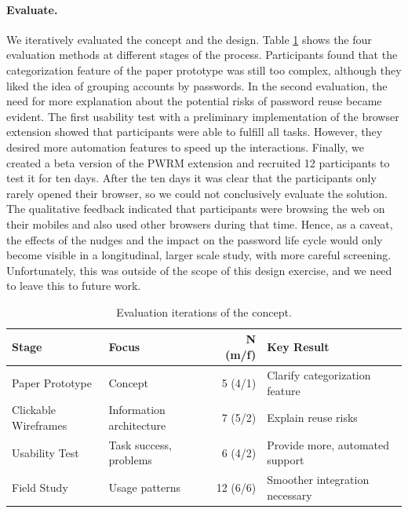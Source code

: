 \paragraph{Evaluate.} 
We iteratively evaluated the concept and the design. Table \ref{tab:pwrm:evaluations} shows the four evaluation methods at different stages of the process. Participants found that the categorization feature of the paper prototype was still too complex, although they liked the idea of grouping accounts by passwords. In the second evaluation, the need for more explanation about the potential risks of password reuse became evident. The first usability test with a preliminary implementation of the browser extension showed that participants were able to fulfill all tasks. However, they desired more automation features to speed up the interactions. Finally, we created a beta version of the PWRM extension and recruited 12 participants to test it for ten days. After the ten days it was clear that the participants only rarely opened their browser, so we could not conclusively evaluate the solution. The qualitative feedback indicated that participants were browsing the web on their mobiles and also used other browsers during that time. Hence, as a caveat, the effects of the nudges and the impact on the password life cycle would only become visible in a longitudinal, larger scale study, with more careful screening. Unfortunately, this was outside of the scope of this design exercise, and we need to leave this to future work. 

\begin{table}
	\begin{tabular}{llrp{9cm}}
		\textbf{Stage} & \textbf{Focus} & \textbf{N} (m/f) & \textbf{Key Result}\\ \hline
		Paper Prototype & Concept & 5 (4/1) & Clarify categorization feature \\
		Clickable Wireframes & Information architecture & 7 (5/2) & Explain reuse risks \\
		Usability Test & Task success, problems & 6 (4/2) & Provide more, automated support \\
		Field Study & Usage patterns & 12 (6/6) & Smoother integration necessary
	\end{tabular}
	\caption{\label{tab:pwrm:evaluations} Evaluation iterations of the concept. }
\end{table}


